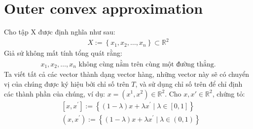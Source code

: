 \documentclass[12pt,a4paper,openany,oneside]{report}
\begin{document}
\section{Outer convex approximation}
Cho tập X được định nghĩa như sau:
\begin{align} \label{ct2.1} 
	X:=\left\{x_1, x_2, \ldots, x_n\right\} \subset \mathbb{R}^2
\end{align}
Giả sử không mất tính tổng quát rằng:
\begin{align} \label{ct2.2} 
	x_1, x_2, \ldots, x_n  \text{ không cùng nằm trên cùng một đường thẳng.}
\end{align}
Ta viết tất cả các vector thành dạng vector hàng, những vector này sẽ có chuyển vị của chúng được ký hiệu bởi chỉ số trên $T$, và sử dụng chỉ số trên để chỉ định các thành phần của chúng, ví dụ: $x = \left(x^1, x^2\right)\in\mathbb{R}^2$. Cho $x, x'\in\mathbb{R}^2$, chứng tỏ:
\begin{equation}\label{ct2.3}
	\begin{aligned}
		& {\left[x, x^{\prime}\right]:=\left\{(1-\lambda) x+\lambda x^{\prime} \mid \lambda \in[0,1]\right\}} \\
		& \left(x, x^{\prime}\right):=\left\{(1-\lambda) x+\lambda x^{\prime} \mid \lambda \in(0,1)\right\}
	\end{aligned}
\end{equation}
\end{document}
